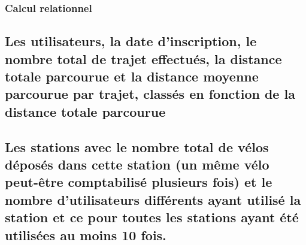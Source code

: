 \documentclass[a4paper,10pt]{article}
\begin{document}
\subsubsection{Calcul relationnel}

\subsection{Les utilisateurs, la date d'inscription, le nombre total de trajet effectués, la distance totale parcourue et la distance moyenne parcourue par trajet, classés en fonction de la distance totale parcourue}


\subsection{Les stations avec le nombre total de vélos déposés dans cette station (un même vélo peut-être comptabilisé plusieurs fois) et le nombre d'utilisateurs différents ayant utilisé la station et ce pour toutes les stations ayant été utilisées au moins 10 fois.}

\end{document}
